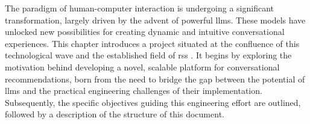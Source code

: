 The paradigm of human-computer interaction is undergoing a significant transformation, largely driven by the advent of powerful \acp{llm}. These models have unlocked new possibilities for creating dynamic and intuitive conversational experiences. This chapter introduces a project situated at the confluence of this technological wave and the established field of \aclp{rs} \cite{BOOK:RS-HANDBOOK}. It begins by exploring the motivation behind developing a novel, scalable platform for conversational recommendations, born from the need to bridge the gap between the potential of \acp{llm} and the practical engineering challenges of their implementation. Subsequently, the specific objectives guiding this engineering effort are outlined, followed by a description of the structure of this document.